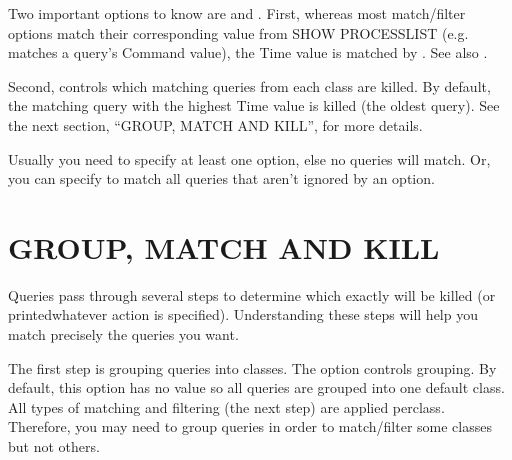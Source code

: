 \documentclass[letterpaper,10pt,english]{sphinxmanual}
\begin{document}
\sphinxAtStartPar
Two important options to know are {\hyperref[\detokenize{mariadb-kill:cmdoption-mariadb-kill-busy-time}]{}} and {\hyperref[\detokenize{mariadb-kill:cmdoption-mariadb-kill-victims}]{}}.
First, whereas most match/filter options match their corresponding value from
SHOW PROCESSLIST (e.g. {\hyperref[\detokenize{mariadb-kill:cmdoption-mariadb-kill-match-command}]{}} matches a query’s Command value),
the Time value is matched by {\hyperref[\detokenize{mariadb-kill:cmdoption-mariadb-kill-busy-time}]{}}.  See also {\hyperref[\detokenize{mariadb-kill:cmdoption-mariadb-kill-interval}]{}}.

\sphinxAtStartPar
Second, {\hyperref[\detokenize{mariadb-kill:cmdoption-mariadb-kill-victims}]{}} controls which matching queries from each class are
killed.  By default, the matching query with the highest Time value is killed
(the oldest query).  See the next section, “GROUP, MATCH AND KILL”,
for more details.

\sphinxAtStartPar
Usually you need to specify at least one  option, else no
queries will match.  Or, you can specify {\hyperref[\detokenize{mariadb-kill:cmdoption-mariadb-kill-match-all}]{}} to match all queries
that aren’t ignored by an  option.


\section{GROUP, MATCH AND KILL}
\label{\detokenize{mariadb-kill:group-match-and-kill}}
\sphinxAtStartPar
Queries pass through several steps to determine which exactly will be killed
(or printed\textendash{}whatever action is specified).  Understanding these steps will
help you match precisely the queries you want.

\sphinxAtStartPar
The first step is grouping queries into classes.  The {\hyperref[\detokenize{mariadb-kill:cmdoption-mariadb-kill-group-by}]{}} option
controls grouping.  By default, this option has no value so all queries are
grouped into one default class.  All types of matching and filtering
(the next step) are applied per\sphinxhyphen{}class.  Therefore, you may need to group
queries in order to match/filter some classes but not others.
\end{document}
